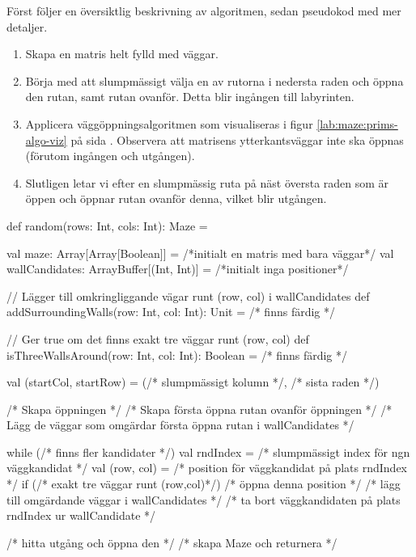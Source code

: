 Först följer en översiktlig beskrivning av algoritmen, sedan pseudokod med mer detaljer.

\begin{enumerate}[noitemsep]
    \item Skapa en matris helt fylld med väggar.
	\item Börja med att slumpmässigt välja en av rutorna i nedersta raden och öppna den rutan, samt rutan ovanför. Detta blir ingången till labyrinten.
	\item Applicera väggöppningsalgoritmen som visualiseras i figur \ref{lab:maze:prims-algo-viz} på sida \pageref{lab:maze:prims-algo-viz}. Observera att matrisens ytterkantsväggar inte ska öppnas (förutom ingången och utgången).
	\item Slutligen letar vi efter en slumpmässig ruta på näst översta raden som är öppen och öppnar rutan ovanför denna, vilket blir utgången.
\end{enumerate}

\begin{CodeSmall}
  def random(rows: Int, cols: Int): Maze = {
    val maze: Array[Array[Boolean]] = /*initialt en matris med bara väggar*/
    val wallCandidates: ArrayBuffer[(Int, Int)] = /*initialt inga positioner*/

    // Lägger till omkringliggande vägar runt (row, col) i wallCandidates
    def addSurroundingWalls(row: Int, col: Int): Unit = /* finns färdig */

    // Ger true om det finns exakt tre väggar runt (row, col)
    def isThreeWallsAround(row: Int, col: Int): Boolean = /* finns färdig */

    val (startCol, startRow) = (/* slumpmässigt kolumn */, /* sista raden */)

    /* Skapa öppningen */
    /* Skapa första öppna rutan ovanför öppningen */
    /* Lägg de väggar som omgärdar första öppna rutan i wallCandidates */ 

    while (/* finns fler kandidater */) {
      val rndIndex = /* slumpmässigt index för ngn väggkandidat */
      val (row, col) = /* position för väggkandidat på plats rndIndex */
      if (/* exakt tre väggar runt (row,col)*/) {
        /* öppna denna position */
        /* lägg till omgärdande väggar i wallCandidates */
      }
      /* ta bort väggkandidaten på plats rndIndex ur wallCandidate */
    }

    /* hitta utgång och öppna den */
    /* skapa Maze och returnera */
  }
\end{CodeSmall}


